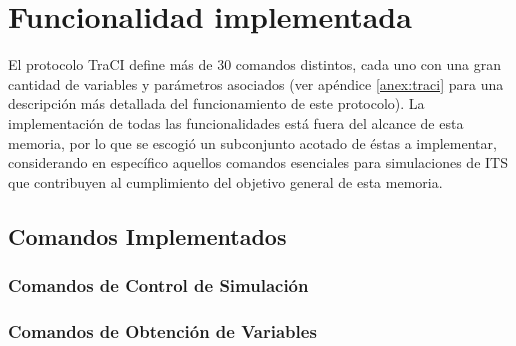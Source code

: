 \section{Funcionalidad implementada}\label{sec:functionality}

El protocolo TraCI define más de 30 comandos distintos, cada uno con una gran cantidad de variables y parámetros asociados (ver apéndice \ref{anex:traci} para una descripción más detallada del funcionamiento de este protocolo). La implementación de todas las funcionalidades está fuera del alcance de esta memoria, por lo que se escogió un subconjunto acotado de éstas a implementar, considerando en específico aquellos comandos esenciales para simulaciones de ITS que contribuyen al cumplimiento del objetivo general de esta memoria.

\subsection{Comandos Implementados} \label{sec:comandos}

\subsubsection{Comandos de Control de Simulación}\label{sec:comandos:controlsim}

\begin{itemize}
    \begin{multicols}{2}
    \end{multicols}
\end{itemize}

\subsubsection{Comandos de Obtención de Variables}

